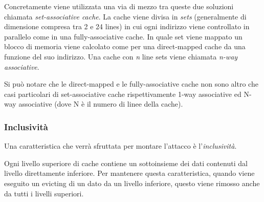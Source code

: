 				Concretamente viene utilizzata una via di mezzo tra queste due soluzioni chiamata \emph{set-associative cache}. La cache viene divisa in \emph{sets} (generalmente di dimensione compresa tra 2 e 24 lines) in cui ogni indirizzo viene controllato in parallelo come in una fully-associative cache. In quale set viene mappato un blocco di memoria viene calcolato come per una direct-mapped cache da una funzione del suo indirizzo. Una cache con \emph{n} line sets viene chiamata \emph{n-way associative}.
				
				Si può notare che le direct-mapped e le fully-associative cache non sono altro che casi particolari di set-associative cache rispettivamente 1-way associative ed N-way associative (dove N è il numero di linee della cache).
				
			\subsubsection{Inclusività}
				Una caratteristica che verrà sfruttata per montare l'attacco è l'\emph{inclusività}. 
				
				Ogni livello superiore di cache contiene un sottoinsieme dei dati contenuti dal livello direttamente inferiore. Per mantenere questa caratteristica, quando viene eseguito un evicting di un dato da un livello inferiore, questo viene rimosso anche da tutti i livelli superiori.
				
			
			
	